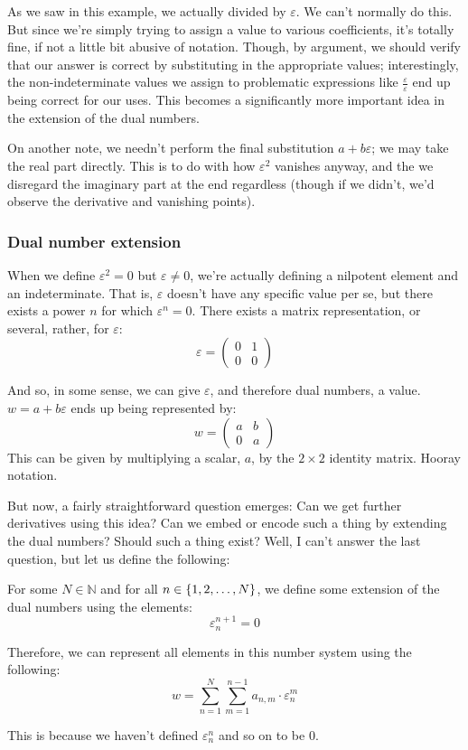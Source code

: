 As we saw in this example, we actually divided by $\varepsilon$. We can't normally do this. But since we're simply trying to assign a value to various coefficients, it's totally fine, if not a little bit abusive of notation. Though, by argument, we should verify that our answer is correct by substituting in the appropriate values; interestingly, the non-indeterminate values we assign to problematic expressions like $\frac{\varepsilon}{\varepsilon}$ end up being correct for our uses. This becomes a significantly more important idea in the extension of the dual numbers.

On another note, we needn't perform the final substitution $a+b\varepsilon$; we may take the real part directly. This is to do with how $\varepsilon^2$ vanishes anyway, and the we disregard the imaginary part at the end regardless (though if we didn't, we'd observe the derivative and vanishing points).

\subsubsection{Dual number extension}
When we define $\varepsilon^2=0$ but $\varepsilon\neq 0$, we're actually defining a nilpotent element and an indeterminate. That is, $\varepsilon$ doesn't have any specific value per se, but there exists a power $n$ for which $\varepsilon^n=0$. There exists a matrix representation, or several, rather, for $\varepsilon$:
$$
    \varepsilon=\begin{pmatrix}
        0 & 1 \\
        0 & 0
    \end{pmatrix}
$$

And so, in some sense, we can give $\varepsilon$, and therefore dual numbers, a value. $w=a+b\varepsilon$ ends up being represented by:
$$
    w=\begin{pmatrix}
        a & b \\
        0 & a
    \end{pmatrix}
$$
This can be given by multiplying a scalar, $a$, by the $2\times 2$ identity matrix. Hooray notation.

But now, a fairly straightforward question emerges: Can we get further derivatives using this idea? Can we embed or encode such a thing by extending the dual numbers? Should such a thing exist? Well, I can't answer the last question, but let us define the following:

\begin{theorem}
    For some $N\in\mathbb{N}$ and for all $n\in\{1,2,\dots,N\}$, we define some extension of the dual numbers using the elements:
    $$
        \varepsilon_{n}^{n+1}=0
    $$

    Therefore, we can represent all elements in this number system using the following:
    $$
        w=\sum_{n=1}^{N}{\sum_{m=1}^{n-1}{a_{n,m}\cdot\varepsilon_{n}^{m}}}
    $$

    This is because we haven't defined $\varepsilon_{n}^{n}$ and so on to be $0$.
\end{theorem}

